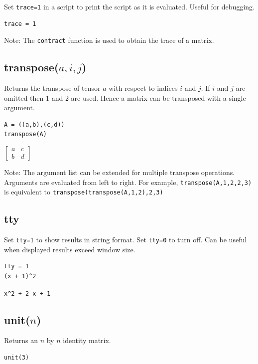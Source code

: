 \documentclass[12pt]{article}
\begin{document}
Set {\tt trace=1} in a script to print the script as it is evaluated.
Useful for debugging.

{\color{blue}
\begin{verbatim}
trace = 1
\end{verbatim}
}

\noindent
Note:
The
\verb$contract$
function is used to obtain the trace of a matrix.

\subsection*{transpose($a,i,j$)}

Returns the transpose of tensor $a$ with respect to indices $i$ and $j$.
If $i$ and $j$ are omitted then 1 and 2 are used.
Hence a matrix can be transposed with a single argument.

{\color{blue}
\begin{verbatim}
A = ((a,b),(c,d))
transpose(A)
\end{verbatim}
}

\noindent
$\displaystyle
\begin{bmatrix}
a & c
\\[1ex]
b & d
\end{bmatrix}
$

\bigskip
\noindent
Note:
The argument list can be extended for multiple transpose operations.
Arguments are evaluated from left to right.
For example,
\verb$transpose(A,1,2,2,3)$
is equivalent to
\verb$transpose(transpose(A,1,2),2,3)$

\subsection*{tty}

Set \verb$tty=1$ to show results in string format.
Set \verb$tty=0$ to turn off.
Can be useful when displayed results exceed window size.

{\color{blue}
\begin{verbatim}
tty = 1
(x + 1)^2
\end{verbatim}
}

\noindent
\verb$x^2 + 2 x + 1$

\subsection*{unit($n$)}

Returns an $n$ by $n$ identity matrix.

{\color{blue}
\begin{verbatim}
unit(3)
\end{verbatim}
}
\end{document}
